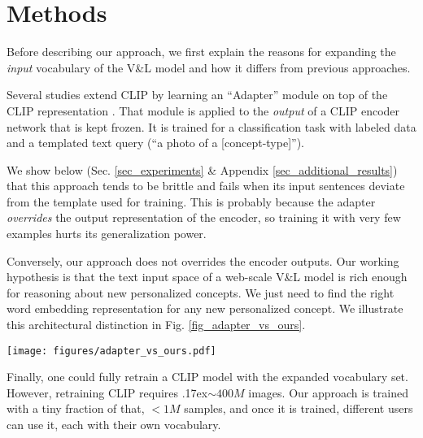 \documentclass[runningheads]{llncs}
\newcommand{\tildeapprox}{{\raise.17ex\hbox{$\scriptstyle\sim$}}}
\newcommand{\figref}[1]{Fig. \ref{#1}}
\newcommand\edit[1]{#1}
\newcommand{\VL}{V\&L {}}
\begin{document}
\section{Methods}
\label{sec:methods}

Before describing our approach, we first explain the reasons for expanding the \textit{input} vocabulary of the \VL model and how it differs from previous approaches.

Several studies extend CLIP by learning an ``Adapter'' module on top of the CLIP representation \cite{gao2021clip,skantze2021collie,zhang2021tip,ma2021simple,houlsby2019parameter}. That module is applied to the \textit{output} of a CLIP encoder network that is kept frozen. It is trained for a classification task with labeled data and a templated text query (``a photo of a [concept-type]'').

We show below (Sec. \ref{sec_experiments} \& Appendix \ref{sec_additional_results}) that this approach tends to be brittle and fails when its input sentences deviate from the template used for training. This is probably because the adapter \textit{overrides} the output representation of the encoder, so training it with very few examples hurts its generalization power.

Conversely, our approach does not overrides the encoder outputs. Our working hypothesis is that the text input space of a web-scale \VL model is rich enough for reasoning about new personalized concepts. We just need to find the right word embedding representation for any new personalized concept. We illustrate this architectural distinction in \figref{fig_adapter_vs_ours}.
\begin{SCfigure}
    \centering   
    \texttt{[image: figures/adapter\_vs\_ours.pdf]} 
    \caption{Visualization of an adapter-based approach (left) and PALAVRA (right). Adapters change CLIP's output space by appending additional layers following the encoder. Our method defines new tokens in CLIP's existing input space, leaving the output space unchanged.}
    \label{fig_adapter_vs_ours}
\end{SCfigure}

\edit{Finally, one could fully retrain a CLIP model with the expanded vocabulary set. However, retraining CLIP requires \tildeapprox $400M$ images. Our approach is trained with a tiny fraction of that, $< 1 M$ samples, and once it is trained, different users can use it, each with their own vocabulary.}
\end{document}
